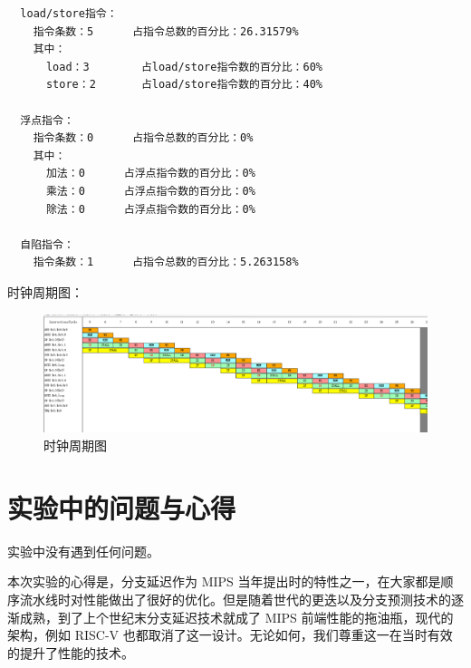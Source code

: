 \documentclass[blue,normal,cn]{elegantnote}
\begin{document}
\begin{enumerate}[wide=0pt, listparindent=2em, parsep=0pt]
\begin{itemize}[leftmargin=3em, listparindent=2em, parsep=0pt]
\begin{lstlisting}
  load/store指令：
    指令条数：5		占指令总数的百分比：26.31579%
    其中：
      load：3		占load/store指令数的百分比：60%
      store：2		占load/store指令数的百分比：40%

  浮点指令：
    指令条数：0		占指令总数的百分比：0%
    其中：
      加法：0		占浮点指令数的百分比：0%
      乘法：0		占浮点指令数的百分比：0%
      除法：0		占浮点指令数的百分比：0%

  自陷指令：
    指令条数：1		占指令总数的百分比：5.263158%

\end{lstlisting}

                \textcolor{ans}{时钟周期图：}
                \begin{figure}[H]
                  \centering
                  \includegraphics[width=.8\textwidth]{fig/delayed-branch.png}
                  \caption{时钟周期图}
                \end{figure}


        \end{itemize}

\end{enumerate}

\section{实验中的问题与心得}

实验中没有遇到任何问题。

本次实验的心得是，分支延迟作为 MIPS 当年提出时的特性之一，在大家都是顺序流水线时对性能做出了很好的优化。但是随着世代的更迭以及分支预测技术的逐渐成熟，到了上个世纪末分支延迟技术就成了 MIPS 前端性能的拖油瓶，现代的架构，例如 RISC-V 也都取消了这一设计。无论如何，我们尊重这一在当时有效的提升了性能的技术。
\end{document}
